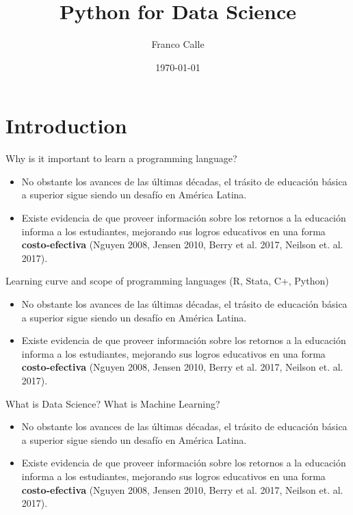 \documentclass{beamer}
\title{Python for Data Science}
\date{\today}
\author{Franco Calle}
\institute{Princeton University}
\begin{document}
  \maketitle
  \section{Introduction}
	\begin{frame}{Why is it important to learn a programming language?}
		\begin{itemize}
		\item No obstante los avances de las últimas décadas, el trásito de educación básica a superior sigue siendo un desafío en América Latina.
		\item Existe evidencia de que proveer información sobre los retornos a la educación informa a los estudiantes, mejorando sus logros educativos en una forma  \textbf{costo-efectiva} (Nguyen 2008, Jensen 2010, Berry et al. 2017, Neilson et. al. 2017). 
		\end{itemize}
	\end{frame}
	\begin{frame}{Learning curve and scope of programming languages (R, Stata, C+, Python)}
		\begin{itemize}
		\item No obstante los avances de las últimas décadas, el trásito de educación básica a superior sigue siendo un desafío en América Latina.
		\item Existe evidencia de que proveer información sobre los retornos a la educación informa a los estudiantes, mejorando sus logros educativos en una forma  \textbf{costo-efectiva} (Nguyen 2008, Jensen 2010, Berry et al. 2017, Neilson et. al. 2017). 
		\end{itemize}
	\end{frame}

	\begin{frame}{What is Data Science? What is Machine Learning?}
		\begin{itemize}
		\item No obstante los avances de las últimas décadas, el trásito de educación básica a superior sigue siendo un desafío en América Latina.
		\item Existe evidencia de que proveer información sobre los retornos a la educación informa a los estudiantes, mejorando sus logros educativos en una forma  \textbf{costo-efectiva} (Nguyen 2008, Jensen 2010, Berry et al. 2017, Neilson et. al. 2017). 
		\end{itemize}
	\end{frame}
\end{document}
